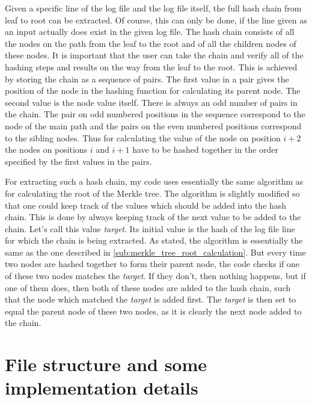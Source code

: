 \documentclass[11pt]{article}
\begin{document}
Given a specific line of the log file and the log file itself, the full hash chain from leaf to root can be extracted. Of course, this can only be done, if the line given as an input actually does exist in the given log file. The hash chain consists of all the nodes on the path from the leaf to the root and of all the children nodes of these nodes. It is important that the user can take the chain and verify all of the hashing steps and results on the way from the leaf to the root. This is achieved by storing the chain as a sequence of pairs. The first value in a pair gives the position of the node in the hashing function for calculating its parent node. The second value is the node value itself. There is always an odd number of pairs in the chain. The pair on odd numbered positions in the sequence correspond to the node of the main path and the pairs on the even numbered positions correspond to the sibling nodes. Thus for calculating the value of the node on position $i+2$ the nodes on positions $i$ and $i+1$ have to be hashed together in the order specified by the first values in the pairs. 

For extracting such a hash chain, my code uses essentially the same algorithm as for calculating the root of the Merkle tree. The algorithm is slightly modified so that one could keep track of the values which should be added into the hash chain. This is done by always keeping track of the next value to be added to the chain. Let's call this value \emph{target}. Its initial value is the hash of the log file line for which the chain is being extracted. As stated, the algorithm is essentially the same as the one described in \cref{sub:merkle_tree_root_calculation}. But every time two nodes are hashed together to form their parent node, the code checks if one of these two nodes matches the \emph{target}. If they don't, then nothing happens, but if one of them does, then both of these nodes are added to the hash chain, such that the node which matched the \emph{target} is added first. The \emph{target} is then set to equal the parent node of these two nodes, as it is clearly the next node added to the chain.



\section{File structure and some implementation details} %
\label{sec:file_structure_and_some_implementation_details}
\end{document}
